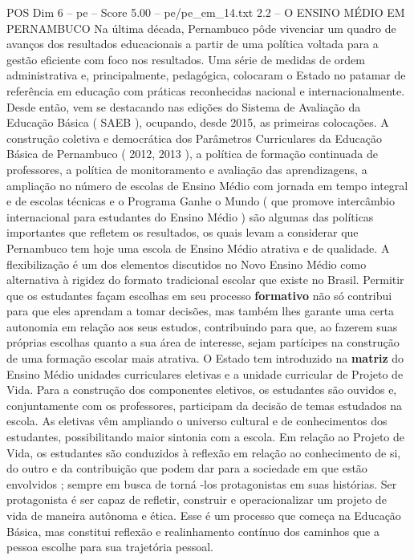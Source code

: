 \begin{textsample}{POS Dim 6 – pe – Score 5.00 – pe/pe\_em\_14.txt}  \label{ex:f6_pos_259}
2.2 – O ENSINO MÉDIO EM PERNAMBUCO Na última década, Pernambuco pôde vivenciar um quadro de avanços dos resultados educacionais a partir de uma política voltada para a gestão eficiente com foco nos resultados.
Uma série de medidas de ordem administrativa e, principalmente, pedagógica, colocaram o Estado no patamar de referência em educação com práticas reconhecidas nacional e internacionalmente.
Desde então, vem se destacando nas edições do Sistema de Avaliação da Educação Básica ( SAEB ), ocupando, desde 2015, as primeiras colocações.
A construção coletiva e democrática dos Parâmetros Curriculares da Educação Básica de Pernambuco ( 2012, 2013 ), a política de formação continuada de professores, a política de monitoramento e avaliação das aprendizagens, a ampliação no número de escolas de Ensino Médio com jornada em tempo integral e de escolas técnicas e o Programa Ganhe o Mundo ( que promove intercâmbio internacional para estudantes do Ensino Médio ) são algumas das políticas importantes que refletem os resultados, os quais levam a considerar que Pernambuco tem hoje uma escola de Ensino Médio atrativa e de qualidade.
A flexibilização é um dos elementos discutidos no Novo Ensino Médio como alternativa à rigidez do formato tradicional escolar que existe no Brasil.
Permitir que os estudantes façam escolhas em seu processo \textbf{formativo} não só contribui para que eles aprendam a tomar decisões, mas também lhes garante uma certa autonomia em relação aos seus estudos, contribuindo para que, ao fazerem suas próprias escolhas quanto a sua área de interesse, sejam partícipes na construção de uma formação escolar mais atrativa.
O Estado tem introduzido na \textbf{matriz} do Ensino Médio unidades curriculares eletivas e a unidade curricular de Projeto de Vida.
Para a construção dos componentes eletivos, os estudantes são ouvidos e, conjuntamente com os professores, participam da decisão de temas estudados na escola.
As eletivas vêm ampliando o universo cultural e de conhecimentos dos estudantes, possibilitando maior sintonia com a escola.
Em relação ao Projeto de Vida, os estudantes são conduzidos à reflexão em relação ao conhecimento de si, do outro e da contribuição que podem dar para a sociedade em que estão envolvidos ; sempre em busca de torná -los protagonistas em suas histórias.
Ser protagonista é ser capaz de refletir, construir e operacionalizar um projeto de vida de maneira autônoma e ética.
Esse é um processo que começa na Educação Básica, mas constitui reflexão e realinhamento contínuo dos caminhos que a pessoa escolhe para sua trajetória pessoal.

\end{textsample}

